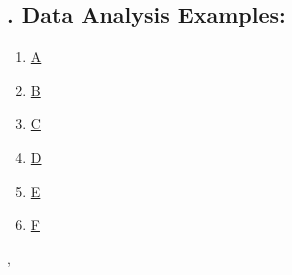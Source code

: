\documentclass[11pt]{article}
\renewcommand{\today}{\shortmonthname[\the\month] \the \day,  \the\year}
\begin{document}
\subsection*{\small {}. Data Analysis Examples:}

\vspace{-0.5cm}

\begin{multicols}{6}
	\begin{enumerate}
		\item \href{https://mp.weixin.qq.com/s/7mbg7zPSUTcw6dvX5mgnVQ}{A}	%
		\item \href{https://mp.weixin.qq.com/s/KDvDuEhUfKTEW9MpMfmu9Q}{B}	%
		\item \href{https://mp.weixin.qq.com/s/VL846RDIFTaO2uDLI4glYA}{C}	%
		\item \href{https://mp.weixin.qq.com/s/MsBSSczsxocPmyBFYGaXaw}{D}	%
		\item \href{https://mp.weixin.qq.com/s/3ZszF8KPzWUX8RDBfrzW-g}{E}	%
		\item \href{https://mp.weixin.qq.com/s/KH9Nf8Mkpjt_X8tBCKhwfg}{F}	%
	\end{enumerate}
\end{multicols}





%
\begin{flushright}
	\tiny \today 
\end{flushright}
\end{document}
